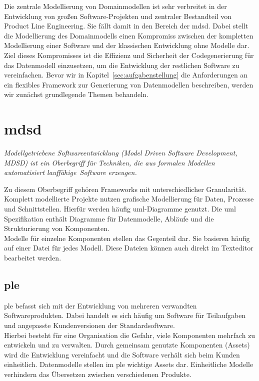 \documentclass[./einleitung.tex]{subfiles}
\begin{document}
Die zentrale Modellierung von Domainmodellen ist sehr verbreitet in der Entwicklung von großen Software-Projekten und zentraler Bestandteil von Product Line Engineering.
Sie fällt damit in den Bereich der \acrfull{mdsd}.
Dabei stellt die Modellierung des Domainmodells einen Kompromiss zwischen der kompletten Modellierung einer Software und der klassischen Entwicklung ohne Modelle dar. \\
Ziel dieses Kompromisses ist die Effizienz und Sicherheit der Codegenerierung für das Datenmodell einzusetzen, um die Entwicklung der restlichen Software zu vereinfachen.
Bevor wir in Kapitel~\ref{sec:aufgabenstellung} die Anforderungen an ein flexibles Framework zur Generierung von Datenmodellen beschreiben, werden wir zunächst grundlegende Themen behandeln.
\section{\acrfull{mdsd}}\label{subsec:mdsd}
\begin{center}
    \textit{Modellgetriebene Softwareentwicklung (Model Driven Software Development, MDSD) ist ein Oberbegriff für Techniken, die aus formalen Modellen automatisiert lauffähige~Software erzeugen.} \cite[p. 11]{modellbuch}
\end{center}
Zu diesem Oberbegriff gehören Frameworks mit unterschiedlicher Granularität.
Komplett modellierte Projekte nutzen grafische Modellierung für Daten, Prozesse und Schnittstellen.
Hierfür werden häufig \acrshort{uml}-Diagramme genutzt.
Die \acrshort{uml} Spezifikation enthält Diagramme für Datenmodelle, Abläufe und die Strukturierung von Komponenten.\\
Modelle für einzelne Komponenten stellen das Gegenteil dar.
Sie basieren häufig auf einer Datei für jedes Modell.
Diese Dateien können auch direkt im Texteditor bearbeitet werden.
\subsection{\acrfull{ple}}\label{subsec:ple}
\acrshort{ple} befasst sich mit der Entwicklung von mehreren verwandten Softwareprodukten.
Dabei handelt es sich häufig um Software für Teilaufgaben und angepasste Kundenversionen der Standardsoftware. \\
Hierbei besteht für eine Organisation die Gefahr, viele Komponenten mehrfach zu entwickeln und zu verwalten.
Durch gemeinsam genutzte Komponenten (Assets) wird die Entwicklung vereinfacht und die Software verhält sich beim Kunden einheitlich.
Datenmodelle stellen im \acrshort{ple} wichtige Assets dar.
Einheitliche Modelle verhindern das Übersetzen zwischen verschiedenen Produkte.
\end{document}
